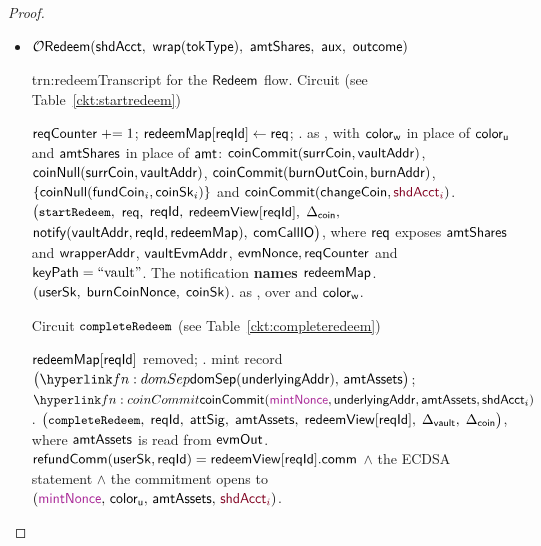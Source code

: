 \begin{proof}
\begin{itemize} [label=$\blacksquare$]
\begin{itemize}
\item $\ORed(\shdAcct\bc \wrapOf{\tokType}\bc \amtShares\bc \auxx\bc \outc)$
\begin{TxtBox}{trn:redeem}{Transcript for the $\mathsf{Redeem}$ flow.}
 Circuit \upd{$\cktStartRedeem$} (see Table~\ref{ckt:startredeem})
\begin{OutList}
\oitem{\Dvault} $\mathsf{reqCounter} \mathrel{+}= 1$; \; $\mathsf{redeemMap}[\mathsf{reqId}] \gets \mathsf{req}$; \;
  .
\oitem{\Dshd} as , with $\mathsf{color}_{\mathsf{w}}$ in place of $\mathsf{color}_{\mathsf{u}}$ and $\mathsf{amtShares}$ in place
  of $\mathsf{amt}$: \;
  \bluedot $\mathsf{coinCommit}(\mathsf{surrCoin}, \mathsf{vaultAddr})$, \; \bluedot $\mathsf{coinNull}(\mathsf{surrCoin}, \mathsf{vaultAddr})$, \;
  \bluedot $\mathsf{coinCommit}(\mathsf{burnOutCoin}, \mathsf{burnAddr})$, \;
  \bluedot $\{\mathsf{coinNull}(\mathsf{fundCoin}_i, \mathsf{coinSk}_i)\}$ and $\coinCommit(\coinChange, \secret{\srcAcct_i})$.
\oitem{\stmt} $\bigl(\texttt{\small startRedeem},$ $\mathsf{req},$ $\mathsf{reqId},$ $\mathsf{redeemView}[\mathsf{reqId}],$ $\Delta_{\mathsf{coin}},$
  $\mathsf{notify}(\mathsf{vaultAddr}, \mathsf{reqId}, \mathsf{redeemMap}),$ $\mathsf{comCallIO}\bigr)$, where $\mathsf{req}$ exposes
   $\mathsf{amtShares}$ and $\mathsf{wrapperAddr}$, $\mathsf{vaultEvmAddr}$, $\mathsf{evmNonce}, \mathsf{reqCounter}$ and $\mathsf{keyPath} = \text{``vault''}$. The
  notification \textbf{names $\mathsf{redeemMap}$}.
\oitem{\wit} $(\mathsf{userSk},\; \mathsf{burnCoinNonce},\; \mathsf{coinSk})$.
\oitem{\Rel} as , over \upd{$\redeemView$} and $\mathsf{color}_{\mathsf{w}}$.
\end{OutList}

\vspace{5pt}
Circuit $\texttt{\small completeRedeem}$ (see Table~\ref{ckt:completeredeem})
\begin{OutList}
\oitem{\Dvault} $\mathsf{redeemMap}[\mathsf{reqId}]$ removed; .
\oitem{\Dshd} \bluedot mint record $\bigl(\lnk{fn:domSep}{\domSep(\underAddr)},\, \amtAssets\bigr)$; \;
  \bluedot $\lnk{fn:coinCommit}{\coinCommit(\freshrn{\mintNonce}, \underAddr, \amtAssets, \shdAcct_i)}$.
\oitem{\stmt} $\bigl(\texttt{\small completeRedeem},\; \mathsf{reqId},\; \mathsf{attSig},\; \mathsf{amtAssets},\;
  \mathsf{redeemView}[\mathsf{reqId}],\; \Delta_{\mathsf{vault}},\;
  \Delta_{\mathsf{coin}}\bigr)$, where $\mathsf{amtAssets}$ is read from $\mathsf{evmOut}$.
\oitem{\Rel} $\mathsf{refundComm}(\mathsf{userSk}, \mathsf{reqId}) = \mathsf{redeemView}[\mathsf{reqId}].\mathsf{comm}$
  \;$\wedge$\; the ECDSA statement \;$\wedge$\; the commitment opens to
  $(\freshrn{\mintNonce},\, \colrU,\, \amtAssets,\, \secret{\shdAcct_i})$.
\end{OutList}


\end{TxtBox}
\end{itemize}
\end{itemize}
\end{proof}
